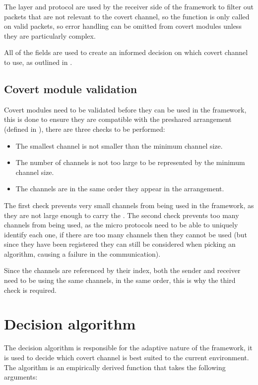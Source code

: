 The layer and protocol are used by the receiver side of the framework to filter out packets that are not relevant to the covert channel, so the  function is only called on valid packets, so error handling can be omitted from covert modules unless they are particularly complex.

All of the fields are used to create an informed decision on which covert channel to use, as outlined in .

\subsection{Covert module validation}

Covert modules need to be validated before they can be used in the framework, this is done to ensure they are compatible with the preshared arrangement (defined in ), there are three checks to be performed:

\begin{itemize}
    \item The smallest channel is not smaller than the minimum channel size.
    \item The number of channels is not too large to be represented by the minimum channel size.
    \item The channels are in the same order they appear in the arrangement.
\end{itemize}

The first check prevents very small channels from being used in the framework, as they are not large enough to carry the . The second check prevents too many channels from being used, as the micro protocols need to be able to uniquely identify each one, if there are too many channels then they cannot be used (but since they have been registered they can still be considered when picking an algorithm, causing a failure in the communication).

Since the channels are referenced by their index, both the sender and receiver need to be using the same channels, in the same order, this is why the third check is required.

\section{Decision algorithm}
\label{sec:decision_algorithm}

The decision algorithm is responsible for the adaptive nature of the framework, it is used to decide which covert channel is best suited to the current environment.
The algorithm is an empirically derived function that takes the following arguments:

